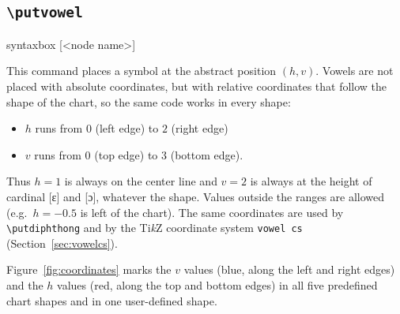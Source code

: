 \documentclass[a4paper,11pt]{article}
\newcommand\cmd[1]{\texttt{\textbackslash #1}}
\begin{document}
\subsection{\cmd{putvowel}}\label{sec:putvowel}

\begin{tcblisting}{syntaxbox}
[<node name>]
\end{tcblisting}

\noindent
This command places a symbol at the abstract position $(h,v)$. Vowels are not placed with absolute coordinates, but with relative coordinates that follow the shape of the chart, so the same code works in every shape:

\begin{itemize}
	\item $h$ runs from $0$ (left edge) to $2$ (right edge)
	\item $v$ runs from $0$ (top edge) to $3$ (bottom edge).
\end{itemize}

\noindent
Thus $h=1$ is always on the center line and $v=2$ is always at the height of cardinal [ɛ] and [ɔ], whatever the shape.
Values outside the ranges are allowed (e.g.\ $h=-0.5$ is left of the chart).
The same coordinates are used by \cmd{putdiphthong} and by the Ti\textit{k}Z coordinate system \texttt{vowel cs} (Section~\ref{sec:vowelcs}).

Figure~\ref{fig:coordinates} marks the $v$ values (blue, along the left and right edges) and the $h$ values (red, along the top and bottom edges) in all five predefined chart shapes and in one user-defined shape.
\end{document}
